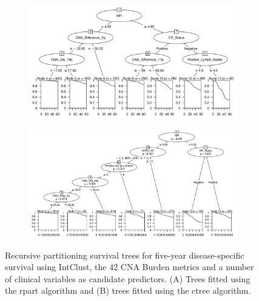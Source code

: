 \begin{figure}[!h]
\centering

\vspace{1cm}

\begin{subfigure}{\textwidth}
\subcaption{}
\includegraphics[width=1\textwidth]{../figures/Chapter_3/Clin_PA_PartyKit_Survival_Burden_FiveYearDSS_INTCLUST.png}
\end{subfigure}

\vspace{2cm}

\begin{subfigure}{\textwidth}
\subcaption{}
\includegraphics[width=1\textwidth]{../figures/Chapter_3/Clin_PA_Ctree_Survival_Burden_FiveYearDSS_INTCLUST.png}
\end{subfigure}

\vspace{1cm}

\caption[Recursive partitioning survival trees for five-year disease-specific survival using IntClust, the 42 CNA Burden metrics and a number of clinical variables as candidate predictors.]{Recursive partitioning survival trees for five-year disease-specific survival using IntClust, the 42 CNA Burden metrics and a number of clinical variables as candidate predictors. (A) Trees fitted using the rpart algorithm and (B) trees fitted using the ctree algorithm.}
\label{fig:PA_INTCLUST_CNA_Burden_FiveYearDSS_Clin}
\end{figure}

